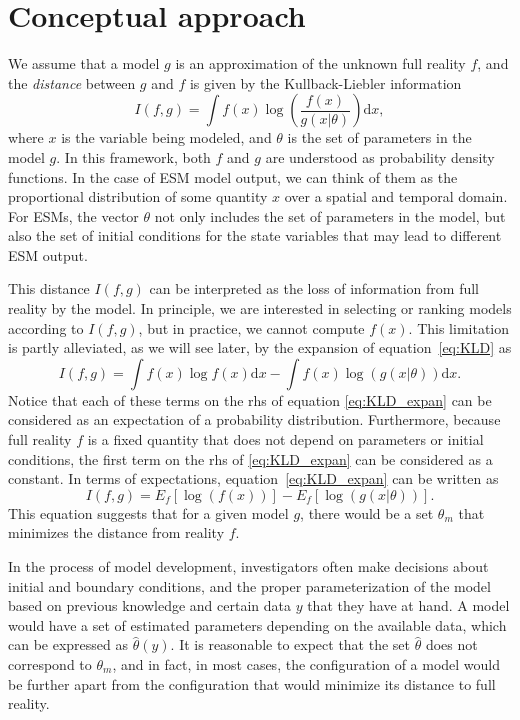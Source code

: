 \documentclass[gmd, manuscript]{copernicus}
\newcommand{\dd}{\mathrm{d}}
\begin{document}
\section{Conceptual approach}
We assume that a model $g$ is an approximation of the unknown full reality $f$, and the \emph{distance} between $g$ and $f$ is given by the Kullback-Liebler information
\begin{equation} \label{eq:KLD}
I(f, g) = \int f(x) \log \left( \frac{f(x)}{g(x | \theta)} \right) \dd x,
\end{equation}
where $x$ is the variable being modeled, and $\theta$ is the set of parameters in the model $g$. 
In this framework, both $f$ and $g$ are understood as probability density functions. In the case of ESM model output, we can think of them as the proportional distribution of some quantity $x$ over a spatial and temporal domain. 
For ESMs, the vector $\theta$ not only includes the set of  parameters in the model, but also the set of initial conditions for the state variables that may lead to different ESM output. 

This distance $I(f, g)$ can be interpreted as the loss of information from full reality by the model. In principle, we are interested in selecting or ranking models according to $I(f, g)$, but in practice, we cannot compute $f(x)$. 
This limitation is partly alleviated, as we will see later, by the expansion of equation~\ref{eq:KLD} as
\begin{equation} \label{eq:KLD_expan}
I(f, g) = \int f(x) \log f(x) \dd x - \int f(x) \log (g(x | \theta)) \dd x.
\end{equation}
Notice that each of these terms on the rhs of equation \ref{eq:KLD_expan} can be considered as an expectation of a probability distribution. Furthermore, because full reality $f$ is a fixed quantity that does not depend on parameters or initial conditions, the first term on the rhs of \ref{eq:KLD_expan} can be considered as a constant. In terms of expectations, equation~\ref{eq:KLD_expan} can be written as
\begin{equation}\label{eq:KLD_expect}
I(f, g)  = E_f[ \log(f(x)) ] - E_f [ \log (g(x | \theta)) ].
\end{equation}
This equation suggests that for a given model $g$, there would be a set $\theta_m$ that minimizes the distance from reality $f$. 

In the process of model development, investigators often make decisions about initial and boundary conditions, and the proper parameterization of the model based on previous knowledge and certain data $y$ that they have at hand. A model would have a set of estimated parameters depending on the available data, which can be expressed as $\hat{\theta} (y)$. It is reasonable to expect that the set $\hat{\theta}$ does not correspond to $\theta_m$, and in fact, in most cases, the configuration of a model would be further apart from the configuration that would minimize its distance to full reality. 
\end{document}
